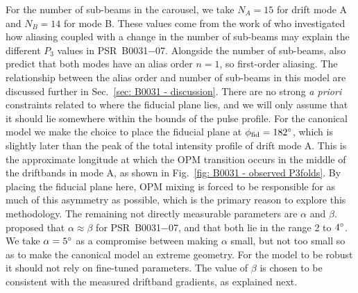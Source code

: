 For the number of sub-beams in the carousel, we take $N_A = 15$ for drift mode A and $N_B = 14$ for mode B. These values come from the work of \citet{MBW+2019} who investigated how aliasing coupled with a change in the number of sub-beams may explain the different $P_3$ values in PSR~B0031$-$07. Alongside the number of sub-beams, \citet{MBW+2019} also predict that both modes have an alias order $n = 1$, so first-order aliasing. The relationship between the alias order and number of sub-beams in this model are discussed further in Sec.~\ref{sec: B0031 - discussion}. There are no strong \textit{a priori} constraints related to where the fiducial plane lies, and we will only assume that it should lie somewhere within the bounds of the pulse profile. For the canonical model we make the choice to place the fiducial plane at $\phi_\mathrm{fid} = 182^\circ$, which is slightly later than the peak of the total intensity profile of drift mode A. This is the approximate longitude at which the OPM transition occurs in the middle of the driftbands in mode A, as shown in Fig.~\ref{fig: B0031 - observed P3folds}. By placing the fiducial plane here, OPM mixing is forced to be responsible for as much of this asymmetry as possible, which is the primary reason to explore this methodology. The remaining not directly measurable parameters are $\alpha$ and $\beta$. \citet{SMS+2007} proposed that $\alpha \approx \beta$ for PSR~B0031$-$07, and that both lie in the range 2 to $4^\circ$. We take $\alpha = 5^\circ$ as a compromise between making $\alpha$ small, but not too small so as to make the canonical model an extreme geometry. For the model to be robust it should not rely on fine-tuned parameters. The value of $\beta$ is chosen to be consistent with the measured driftband gradients, as explained next. 

